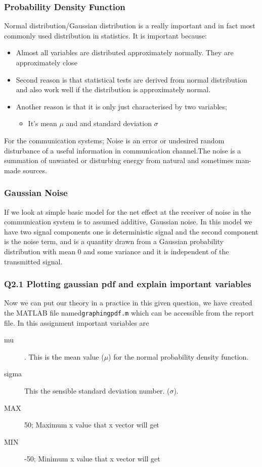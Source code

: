 \documentclass{beamer}
\newcommand{\code}[1]{\texttt{#1}}
\begin{document}
\begin{frame}
	\frametitle{Probability Density Function}

Normal distribution/Gaussian distribution is a really important and in fact most commonly used distribution in statistics.  It is important because:
	\begin{itemize}
		\item Almost all variables are distributed approximately normally. They are approximately close
		\item Second reason is that statistical tests are derived from normal distribution and also work well if the distribution is approximately normal.
		\item Another reason is that it is only just characterised by two variables;
			\begin{itemize}
				\item It's mean $\mu$ and and standard deviation $\sigma$
			\end{itemize}
	\end{itemize}
For the communication systems;
Noise is an error or undesired random disturbance of a useful information in communication channel.The noise is a summation of unwanted or disturbing energy from natural and sometimes man-made sources.
\end{frame}
\begin{frame}
	\frametitle{Gaussian Noise}
If we look at simple basic model for the net effect at the receiver of noise in the communication system is to assumed additive, Gaussian noise. In this model we have two signal components one is deterministic signal and  the second component is the noise term, and is a quantity drawn from a Gaussian probability distribution with mean $0$ and some variance and it is  independent of the transmitted signal.
\end{frame}

\begin{frame}
	\frametitle{Q2.1 Plotting gaussian pdf and explain important variables}
Now we can put our theory in a practice in this given question, we have created the MATLAB file named\code{graphingpdf.m} which can be accessible from the report file. In this assignment important variables are

\begin{description}
	\item [mu] . This is the mean value ($\mu$) for the normal probability density function.
	\item [sigma] This the sensible standard deviation number. ($\sigma$).
	\item [MAX] 50; Maximum x value that x vector will get
	\item [MIN] -50; Minimum x value that x vector will get
\end{description}
\end{frame}
\end{document}
